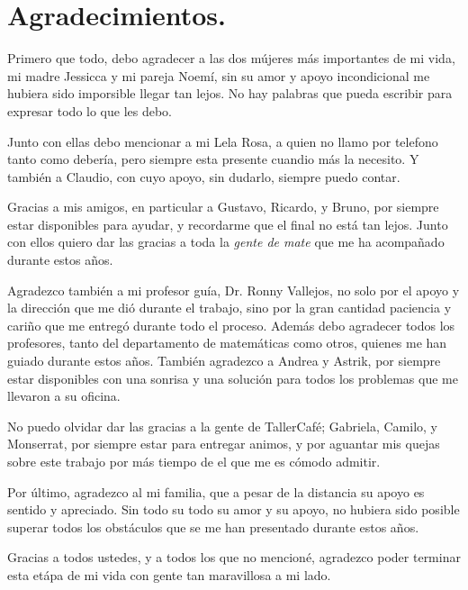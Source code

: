 \chapter*{Agradecimientos.}

Primero que todo, debo agradecer a las dos m\'ujeres m\'as importantes de mi vida, mi madre Jessicca y mi pareja Noem\'i, sin su amor y apoyo incondicional me hubiera sido imporsible llegar tan lejos. No hay palabras que pueda escribir para expresar todo lo que les debo.

Junto con ellas debo mencionar a mi Lela Rosa, a quien no llamo por telefono tanto como deber\'ia, pero siempre esta presente cuandio m\'as la necesito. Y también a Claudio, con cuyo apoyo, sin dudarlo, siempre puedo contar.

Gracias a mis amigos, en particular a Gustavo, Ricardo, y Bruno, por siempre estar disponibles para ayudar, y recordarme que el final no está tan lejos. Junto con ellos quiero dar las gracias a toda la \textit{gente de mate} que me ha acompa\~nado durante estos a\~nos.

Agradezco tambi\'en a mi profesor gu\'ia, Dr. Ronny Vallejos, no solo por el apoyo y la direcci\'on que me dió durante el trabajo, sino por la gran cantidad paciencia y cariño que me entreg\'o durante todo el proceso. Además debo agradecer todos los profesores, tanto del departamento de matem\'aticas como otros, quienes me han guiado durante estos a\~nos. Tambi\'en agradezco a Andrea y Astrik, por siempre estar disponibles con una sonrisa y una soluci\'on para todos los problemas que me llevaron a su oficina.


No puedo olvidar dar las gracias a la gente de TallerCaf\'e; Gabriela, Camilo, y Monserrat, por siempre estar para entregar animos, y por aguantar mis quejas sobre este trabajo por m\'as tiempo de el que me es c\'omodo admitir.

Por \'ultimo, agradezco al mi familia, que a pesar de la distancia su apoyo es sentido y apreciado. Sin todo su todo su amor y su apoyo, no hubiera sido posible superar todos los obst\'aculos que se me han presentado durante estos a\~nos.

Gracias a todos ustedes, y a todos los que no mencion\'e, agradezco poder terminar esta et\'apa de mi vida con gente tan maravillosa a mi lado.